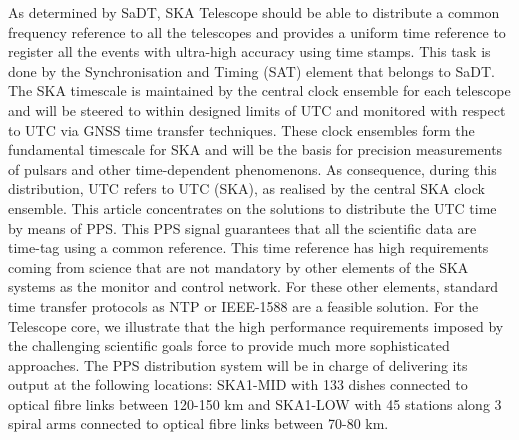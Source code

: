 As determined by SaDT, SKA Telescope should be able to distribute a common
frequency reference to all the telescopes and provides a uniform time reference
to register all the events with ultra-high accuracy using time stamps. This
task is done by the Synchronisation and Timing (SAT) element that belongs to
SaDT. The SKA timescale is maintained by the central clock ensemble for each
telescope and will be steered to within designed limits of UTC and monitored
with respect to UTC via GNSS time transfer techniques. These clock ensembles
form the fundamental timescale for SKA and will be the basis for precision
measurements of pulsars and other time-dependent phenomenons. As consequence,
during this distribution, UTC refers to UTC (SKA), as realised by the central
SKA clock ensemble.  This article concentrates on the solutions to distribute
the UTC time by means of PPS. This PPS signal guarantees that all the
scientific data are time-tag using a common reference. This time reference has
high requirements coming from science that are not mandatory by other elements
of the SKA systems as the monitor and control network. For these other
elements, standard time transfer protocols as NTP or IEEE-1588 are a feasible
solution. For the Telescope core, we illustrate that the high performance
requirements imposed by the challenging scientific goals force to provide much
more sophisticated approaches.  The PPS distribution system will be in charge
of delivering its output at the following locations: SKA1-MID with 133 dishes
connected to optical fibre links between 120-150 km and SKA1-LOW with 45
stations along 3 spiral arms connected to optical fibre links between 70-80 km.

